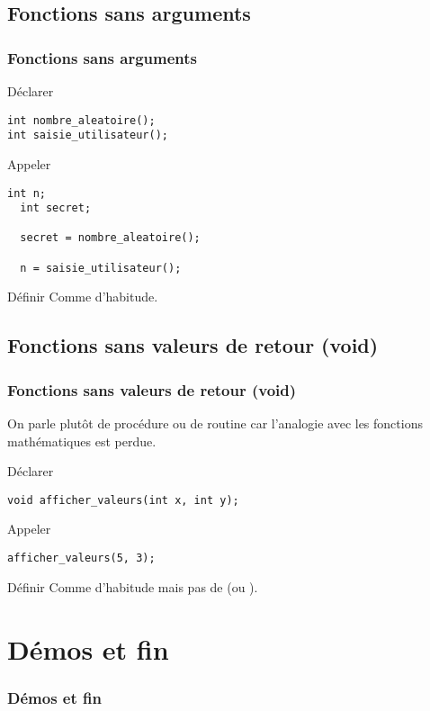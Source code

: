 \documentclass[xcolor=pdftex,svgnames,table]{beamer}
\begin{document}
\subsection{Fonctions sans arguments}
\begin{frame}[fragile]
  \frametitle{Fonctions sans arguments}

 \begin{block}{Déclarer}
    \begin{lstlisting}[basicstyle=\ttfamily\small] 
int nombre_aleatoire();
int saisie_utilisateur();
     \end{lstlisting}
  \end{block}

  \begin{block}{Appeler}
  \begin{lstlisting}[basicstyle=\ttfamily\small] 
  int n;
  int secret;

  secret = nombre_aleatoire();

  n = saisie_utilisateur();
   \end{lstlisting}  
  \end{block}

  \begin{block}{Définir}
Comme d'habitude.
\end{block}
\end{frame}


\subsection[Procédures]{Fonctions sans valeurs de retour (void)}
\begin{frame}[fragile]
  \frametitle{Fonctions sans valeurs de retour (void)}

On parle plutôt de procédure ou de routine car l'analogie avec les
fonctions mathématiques est perdue.

 \begin{block}{Déclarer}
    \begin{lstlisting}[basicstyle=\ttfamily\small] 
void afficher_valeurs(int x, int y);
     \end{lstlisting}
  \end{block}

  \begin{block}{Appeler}
  \begin{lstlisting}[basicstyle=\ttfamily\small] 
afficher_valeurs(5, 3);
   \end{lstlisting}  
  \end{block}

  \begin{block}{Définir}
Comme d'habitude mais pas de  (ou ).
\end{block}
\end{frame}



\section[Démos]{Démos et fin}
\begin{frame}
  \frametitle{Démos et fin}
\end{frame}
\end{document}
